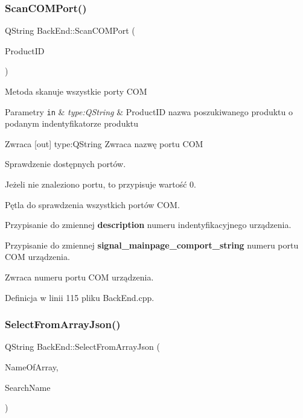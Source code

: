\subsubsection{\texorpdfstring{Scan\+C\+O\+M\+Port()}{ScanCOMPort()}}
{\footnotesize\ttfamily Q\+String Back\+End\+::\+Scan\+C\+O\+M\+Port (\begin{DoxyParamCaption}\item[{Q\+String}]{Product\+ID }\end{DoxyParamCaption})}

Metoda skanuje wszystkie porty C\+OM 
\begin{DoxyParams}[1]{Parametry}
\mbox{\tt in}  & {\em type\+:\+Q\+String} & Product\+ID nazwa poszukiwanego produktu o podanym indentyfikatorze produktu \\
\hline
\end{DoxyParams}
\begin{DoxyReturn}{Zwraca}
\mbox{[}out\mbox{]} type\+:Q\+String Zwraca nazwę portu C\+OM 
\end{DoxyReturn}
Sprawdzenie dostępnych portów.

Jeżeli nie znaleziono portu, to przypisuje wartość 0.

Pętla do sprawdzenia wszystkich portów C\+OM.

Przypisanie do zmiennej {\bfseries description} numeru indentyfikacyjnego urządzenia.

Przypisanie do zmiennej {\bfseries signal\+\_\+mainpage\+\_\+comport\+\_\+string} numeru portu C\+OM urządzenia.

Zwraca numeru portu C\+OM urządzenia. 

Definicja w linii 115 pliku Back\+End.\+cpp.

\mbox{\label{class_back_end_space_1_1_back_end_ad0ad4e5408150784a6a0195776474c56}} 
\subsubsection{\texorpdfstring{Select\+From\+Array\+Json()}{SelectFromArrayJson()}}
{\footnotesize\ttfamily Q\+String Back\+End\+::\+Select\+From\+Array\+Json (\begin{DoxyParamCaption}\item[{Q\+String}]{Name\+Of\+Array,  }\item[{Q\+String}]{Search\+Name }\end{DoxyParamCaption})}

